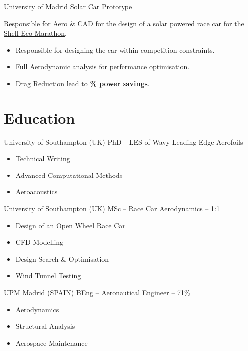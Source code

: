\documentclass[fontsize=10pt]{tccv}
\begin{document}
\begin{eventlist}
     {University of Madrid}
     {Solar Car Prototype}

Responsible for Aero \& CAD for the design of a solar powered race car for the \href{http://www.shell.com/global/environment-society/ecomarathon.html}{Shell Eco-Marathon}.
\begin{itemize}
\itemsep -1pt
	\item Responsible for designing the car within competition constraints.
        \item Full Aerodynamic analysis for performance optimisation.
	\item Drag Reduction lead to \textbf{\% power savings}.
\end{itemize}
\end{eventlist}


\section{Education}

\begin{eventlist}

     	{University of Southampton (UK)}
     	{PhD -- \normalsize{LES of Wavy Leading Edge Aerofoils}} 
	\begin{itemize}
	\itemsep -1pt
		\item Technical Writing
		\item Advanced Computational Methods
		\item Aeroacoustics
	\end{itemize}

     	{University of Southampton (UK)}
     	{MSc -- Race Car Aerodynamics -- 1:1} 
  	\begin{itemize}
	\itemsep -1pt
	   \item Design of an Open Wheel Race Car
	   \item CFD Modelling
	   \item Design Search \& Optimisation
	   \item Wind Tunnel Testing
	\end{itemize}

	{UPM Madrid (SPAIN)}
	{BEng -- Aeronautical Engineer -- 71\%}
  	\begin{itemize}
	\itemsep -1pt
	   \item Aerodynamics
	   \item Structural Analysis
	   \item Aerospace Maintenance
	\end{itemize}
\end{eventlist}
\end{document}
